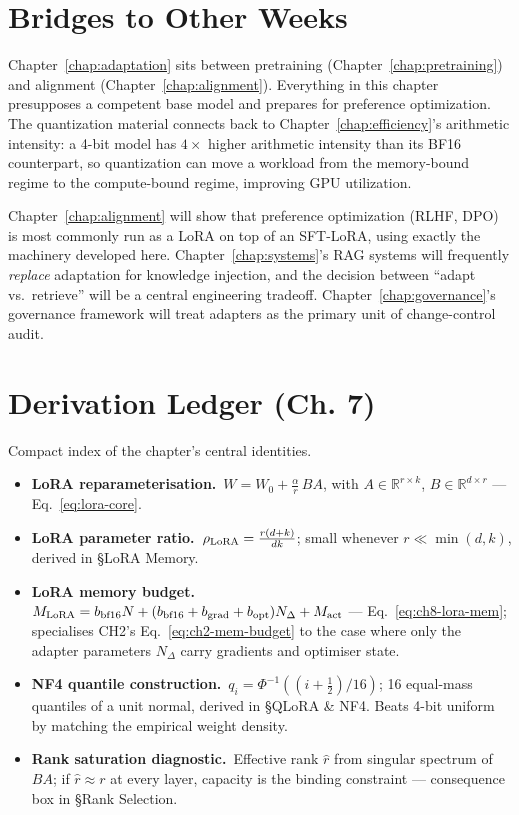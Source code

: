 \section{Bridges to Other Weeks}

Chapter~\ref{chap:adaptation} sits between pretraining (Chapter~\ref{chap:pretraining}) and alignment (Chapter~\ref{chap:alignment}).
Everything in this chapter presupposes a competent base model and
prepares for preference optimization. The quantization material
connects back to Chapter~\ref{chap:efficiency}'s arithmetic intensity: a 4-bit model has
$4\times$ higher arithmetic intensity than its BF16 counterpart, so
quantization can move a workload from the memory-bound regime to
the compute-bound regime, improving GPU utilization.

Chapter~\ref{chap:alignment} will show that preference optimization (RLHF, DPO) is most
commonly run as a LoRA on top of an SFT-LoRA, using exactly the
machinery developed here. Chapter~\ref{chap:systems}'s RAG systems will frequently
\emph{replace} adaptation for knowledge injection, and the decision
between ``adapt vs.\ retrieve'' will be a central engineering tradeoff.
Chapter~\ref{chap:governance}'s governance framework will treat adapters as the primary
unit of change-control audit.

\section*{Derivation Ledger (Ch. 7)}

\begin{derivledger}
Compact index of the chapter's central identities.
\begin{itemize}
  \item \textbf{LoRA reparameterisation.}\
        $W = W_0 + \frac{\alpha}{r}\, B A$, with $A \in \mathbb{R}^{r \times k}$,
        $B \in \mathbb{R}^{d \times r}$ --- Eq.~\eqref{eq:lora-core}.
  \item \textbf{LoRA parameter ratio.}\
        $\rho_{\rm LoRA} = \frac{r(d+k)}{d k}$;
        small whenever $r \ll \min(d, k)$, derived in §LoRA Memory.
  \item \textbf{LoRA memory budget.}\
        $M_{\rm LoRA} = b_{\rm bf16} N + (b_{\rm bf16} + b_{\rm grad} + b_{\rm opt}) N_\Delta + M_{\rm act}$
        --- Eq.~\eqref{eq:ch8-lora-mem}; specialises CH2's
        Eq.~\eqref{eq:ch2-mem-budget} to the case where only the
        adapter parameters $N_\Delta$ carry gradients and optimiser
        state.
  \item \textbf{NF4 quantile construction.}\
        $q_i = \Phi^{-1}((i + \tfrac{1}{2})/16)$;
        16 equal-mass quantiles of a unit normal, derived in
        §QLoRA \& NF4. Beats 4-bit uniform by matching the
        empirical weight density.
  \item \textbf{Rank saturation diagnostic.}\
        Effective rank $\hat r$ from singular spectrum of $BA$;
        if $\hat r \approx r$ at every layer, capacity is the
        binding constraint --- consequence box in §Rank Selection.
\end{itemize}
\end{derivledger}

